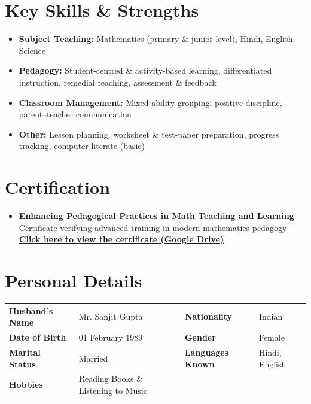 \documentclass[10pt,a4paper]{article}
\begin{document}
\section{Key Skills \& Strengths}
\begin{itemize}[leftmargin=1.1em, itemsep=0pt, topsep=1pt, parsep=0pt]
  \item \textbf{Subject Teaching:} Mathematics (primary \& junior level), Hindi, English, Science
  \item \textbf{Pedagogy:} Student-centred \& activity-based learning, differentiated
        instruction, remedial teaching, assessment \& feedback
  \item \textbf{Classroom Management:} Mixed-ability grouping, positive discipline,
        parent--teacher communication
  \item \textbf{Other:} Lesson planning, worksheet \& test-paper preparation,
        progress tracking, computer-literate (basic)
\end{itemize}

\section{Certification}
\begin{itemize}[leftmargin=1.1em, itemsep=0pt, topsep=1pt, parsep=0pt]
  \item \textbf{\textcolor{primary}{Enhancing Pedagogical Practices in Math Teaching and Learning}}\\
        Certificate verifying advanced training in modern mathematics pedagogy ---
        \href{DRIVE_LINK_HERE}{\textbf{Click here to view the certificate (Google Drive)}}.
\end{itemize}

\section{Personal Details}
\begin{tabularx}{\textwidth}{@{}p{2.6cm} X p{2.6cm} X@{}}
\textbf{Husband's Name}  & Mr. Sanjit Gupta & \textbf{Nationality}     & Indian \\
\textbf{Date of Birth}   & 01 February 1989 & \textbf{Gender}          & Female \\
\textbf{Marital Status}  & Married & \textbf{Languages Known} & Hindi, English \\
\textbf{Hobbies}         & Reading Books \& Listening to Music & & \\
\end{tabularx}
\end{document}
